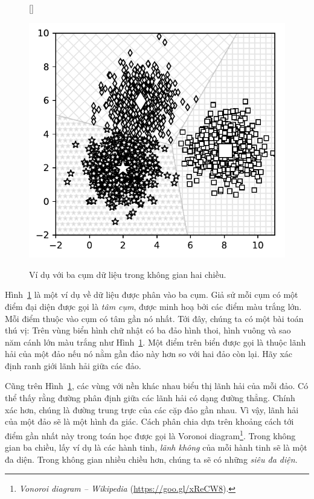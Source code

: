 \begin{figure}[t]
    [\FBwidth]
    {\caption{ 
    Ví dụ với ba cụm dữ liệu trong không gian hai chiều. 
    }
    \label{fig:4_1}}
    { %
    \includegraphics[width=.5\textwidth]{ebookML_src/src/kmeans/ex_5notitle.pdf}
    }
\end{figure}

Hình~\ref{fig:4_1} là một ví dụ về dữ liệu được phân vào ba cụm. Giả sử mỗi cụm
có một điểm đại diện được gọi là \textit{tâm cụm}, được minh hoạ bởi các điểm
màu trắng lớn. Mỗi điểm thuộc vào cụm có tâm gần nó nhất. Tới đây, chúng ta có
một bài toán thú vị: {Trên vùng biển hình chữ nhật có ba đảo hình thoi, hình
vuông và sao năm cánh lớn màu trắng như Hình~\ref{fig:4_1}. Một điểm trên biển
được gọi là thuộc lãnh hải của một đảo nếu nó nằm gần đảo này hơn so với hai đảo
còn lại. Hãy xác định ranh giới lãnh hải giữa các đảo.}

Cũng trên Hình~\ref{fig:4_1}, các vùng với nền khác nhau biểu thị lãnh hải của
mỗi đảo. Có thể thấy rằng đường phân định giữa các lãnh hải có dạng đường
thẳng. Chính xác hơn, chúng là đường trung trực của các cặp đảo gần nhau. Vì
vậy, lãnh hải của một đảo sẽ là một hình đa giác. Cách phân chia dựa trên khoảng
cách tới điểm gần nhất này trong toán học được gọi là Voronoi
diagram\footnote{\textit{Vonoroi diagram -- Wikipedia}
(\url{https://goo.gl/xReCW8}).}. Trong không gian ba chiều, lấy ví dụ là các
hành tinh, \textit{lãnh không} của mỗi hành tinh sẽ là một đa diện. Trong không
gian nhiều chiều hơn, chúng ta sẽ có những \textit{siêu đa diện}.

